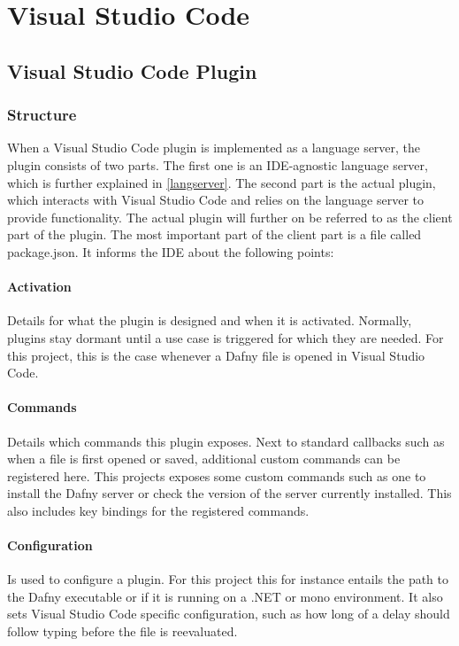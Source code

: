 \section{Visual Studio Code}

\subsection{Visual Studio Code Plugin}
\subsubsection{Structure}
When a Visual Studio Code plugin is implemented as a language server, the plugin consists of two parts. The first one is an IDE-agnostic language server, which is further explained in \ref{langserver}. The second part is the actual plugin, which interacts with Visual Studio Code and relies on the language server to provide functionality. \newline
The actual plugin will further on be referred to as the client part of the plugin. The most important part of the client part is a file called package.json. It informs the IDE about the following points:
\paragraph{Activation}
Details for what the plugin is designed and when it is activated. Normally, plugins stay dormant until a use case is triggered for which they are needed. For this project, this is the case whenever a Dafny file is opened in Visual Studio Code.

\paragraph{Commands}
Details which commands this plugin exposes. Next to standard callbacks such as when a file is first opened or saved, additional custom commands can be registered here. This projects exposes some custom commands such as one to install the Dafny server or check the version of the server currently installed. This also includes key bindings for the registered commands.

\paragraph{Configuration}
Is used to configure a plugin. For this project this for instance entails the path to the Dafny executable or if it is running on a .NET or mono environment. It also sets Visual Studio Code specific configuration, such as how long of a delay should follow typing before the file is reevaluated.

